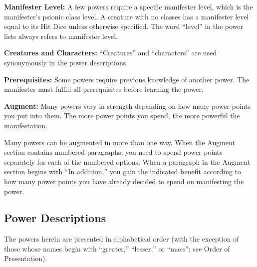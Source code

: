 \textbf{Manifester Level:} A few powers require a specific manifester level, which is the manifester's psionic class level. A creature with no classes has a manifester level equal to its Hit Dice unless otherwise specified. The word ``level'' in the power lists always refers to manifester level.

\textbf{Creatures and Characters:} ``Creatures'' and ``characters'' are used synonymously in the power descriptions.

\textbf{Prerequisites:} Some powers require previous knowledge of another power. The manifester must fulfill all prerequisites before learning the power.

\textbf{Augment:} Many powers vary in strength depending on how many power points you put into them. The more power points you spend, the more powerful the manifestation. %

Many powers can be augmented in more than one way. When the Augment section contains numbered paragraphs, you need to spend power points separately for each of the numbered options. When a paragraph in the Augment section begins with ``In addition,'' you gain the indicated benefit according to how many power points you have already decided to spend on manifesting the power.

% 
% 
% 

\vskip3cm



\clearpage
\begin{strip}
\section{Power Descriptions}
The powers herein are presented in alphabetical order (with the exception of those whose names begin with ``greater,'' ``lesser,'' or ``mass''; see Order of Presentation).
\end{strip}


